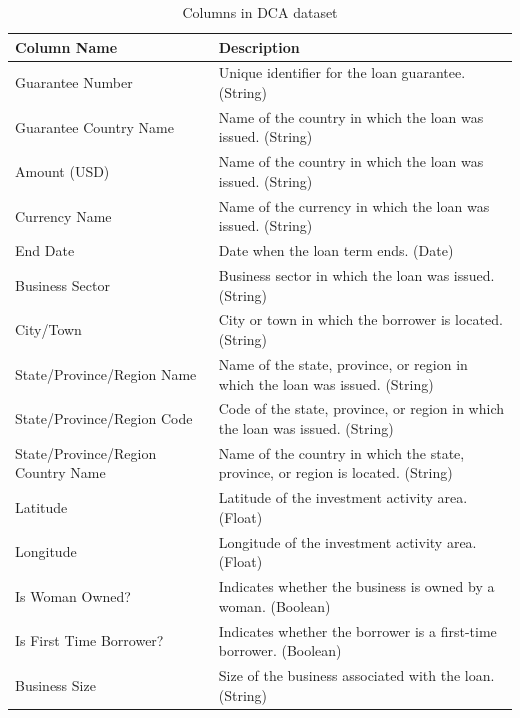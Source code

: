 \begin{table}[h]
\caption{Columns in \acs{DCA} dataset} 
\begin{center}
   
 \begin{tabular}{| p{5cm} | p{11cm} |}
   
\hline
 \textbf{Column Name} & \textbf{Description}\\ \hline \hline

     Guarantee Number &	Unique identifier for the loan guarantee. (String)\\ \hline
     Guarantee Country Name & Name of the country in which the loan was issued. (String)\\ \hline
     Amount (USD) & Name of the country in which the loan was issued. (String)\\ \hline
     Currency Name & Name of the currency in which the loan was issued. (String)\\ \hline
     End Date & Date when the loan term ends. (Date)\\ \hline
     Business Sector & Business sector in which the loan was issued. (String)\\ \hline
     City/Town & City or town in which the borrower is located. (String)\\ \hline
     State/Province/Region Name & Name of the state, province, or region in which the loan was issued. (String)\\ \hline
     State/Province/Region Code & Code of the state, province, or region in which the loan was issued. (String)\\ \hline
     State/Province/Region Country Name & Name of the country in which the state, province, or region is located. (String)\\ \hline
     Latitude & Latitude of the investment activity area. (Float)\\ \hline
     Longitude & Longitude of the investment activity area. (Float)\\ \hline
     Is Woman Owned? & Indicates whether the business is owned by a woman. (Boolean)\\ \hline
     Is First Time Borrower? & Indicates whether the borrower is a first-time borrower. (Boolean)\\ \hline
     Business Size & Size of the business associated with the loan. (String)\\ \hline

\end{tabular}                          
\label{dcadatasetcolumn}   
\end{center}
\end{table}

